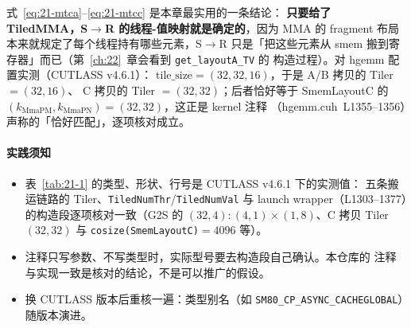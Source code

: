 式~\eqref{eq:21-mtca}--\eqref{eq:21-mtcc} 是本章最实用的一条结论：
\textbf{只要给了 TiledMMA，S$\to$R 的线程-值映射就是确定的}，因为 MMA 的
fragment 布局本来就规定了每个线程持有哪些元素，S$\to$R 只是「把这些元素从
smem 搬到寄存器」而已（第~\ref{ch:22}~章会看到 \texttt{get\_\allowbreak{}layout\allowbreak{}A\_\allowbreak{}TV} 的
构造过程）。对 hgemm 配置实测（CUTLASS v4.6.1）：
$\mathrm{tile\_size} = (32,32,16)$，于是 A/B 拷贝的 Tiler $=(32,16)$、
C 拷贝的 Tiler $=(32,32)$；后者恰好等于 SmemLayoutC 的
$(k_{\mathrm{MmaPM}}, k_{\mathrm{MmaPN}}) = (32,32)$，这正是 kernel 注释
（hgemm.cuh~L1355--1356）声称的「恰好匹配」，逐项核对成立。

\paragraph{实践须知}
\begin{itemize}
  \item 表~\ref{tab:21-1} 的类型、形状、行号是 CUTLASS v4.6.1 下的实测值：
        五条搬运链路的 Tiler、\texttt{TiledNumThr}/\texttt{TiledNumVal}
        与 launch wrapper（L1303--1377）的构造段逐项核对一致（G2S 的
        $(32,4){:}(4,1)\times(1,8)$、C 拷贝 Tiler $(32,32)$ 与
        \texttt{cosize\allowbreak{}(Smem\allowbreak{}Layout\allowbreak{}C)}$=4096$ 等）。
  \item 注释只写参数、不写类型时，实际型号要去构造段自己确认。本仓库的
        注释与实现一致是核对的结论，不是可以推广的假设。
  \item 换 CUTLASS 版本后重核一遍：类型别名（如
        \texttt{SM80\_\allowbreak{}CP\_\allowbreak{}ASYNC\_\allowbreak{}CACHEGLOBAL}）随版本演进。
\end{itemize}

